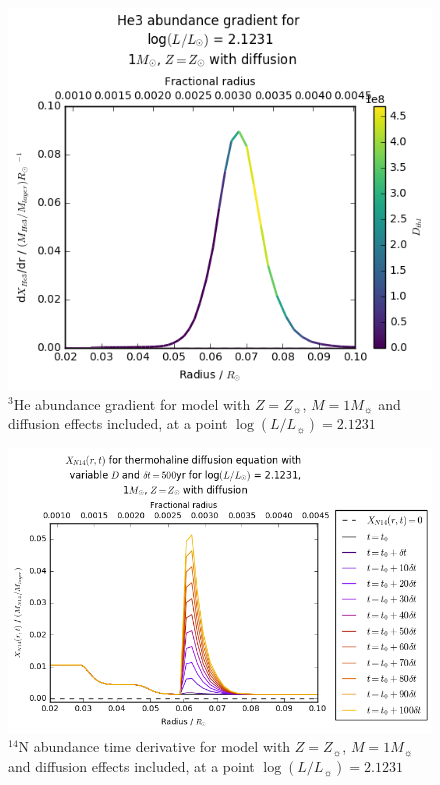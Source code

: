 \documentclass[usenatbib]{mnras}
\begin{document}
\begin{figure}
\begin{center}
\includegraphics[scale=0.4]{../mu_test_data/mu_test_graphs/eq_logL=2p1231_He3_radius_gradient_Dthl_color.png}
\caption{$^{3}$He abundance gradient for model with $Z = Z_{\sun}$, $M = 1M_{\sun}$ and diffusion effects included, at a point $\log(L/L_{\sun}) = 2.1231$}
\label{dHe3/dr_colour}
\end{center}
\end{figure}

\begin{figure}
\begin{center}
\includegraphics[scale=0.4]{../mu_test_data/mu_test_graphs/eq_logL=2p1231_time_diff_eq_Dvar_10dt_dmu_k_lim.png}
\caption{$^{14}$N abundance time derivative for model with $Z = Z_{\sun}$, $M = 1M_{\sun}$ and diffusion effects included, at a point $\log(L/L_{\sun}) = 2.1231$}
\label{dXN14/dt_colour}
\end{center}
\end{figure}
\end{document}
